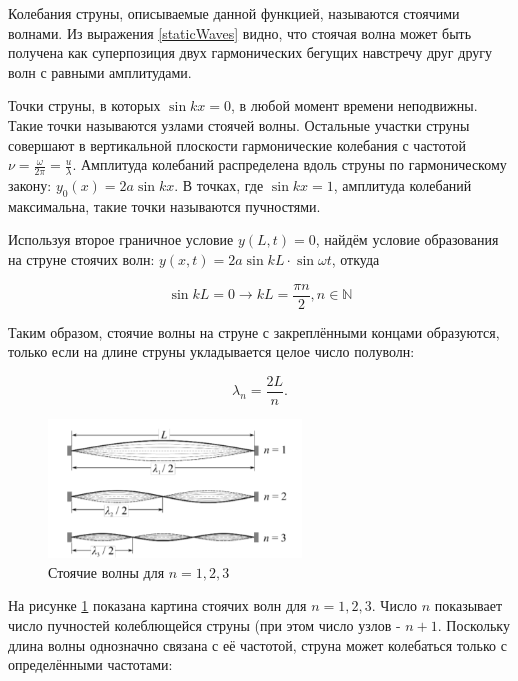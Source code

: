 \documentclass[a4paper,12pt]{article} %
\begin{document}
Колебания струны, описываемые данной функцией, называются стоячими волнами. Из выражения \eqref{staticWaves} видно, что стоячая волна может быть получена как суперпозиция двух гармонических бегущих навстречу друг другу волн с равными амплитудами. 

Точки струны, в которых $ \sin{kx} = 0 $, в любой момент времени неподвижны. Такие точки называются узлами стоячей волны. Остальные участки струны совершают в вертикальной плоскости гармонические колебания с частотой $ \nu = \frac{\omega}{2\pi} = \frac{u}{\lambda} $. Амплитуда колебаний распределена вдоль струны по гармоническому закону: $ y_0(x) = 2a\sin{kx}$. В точках,
где $ \sin{kx} = 1 $, амплитуда колебаний максимальна, такие точки называются пучностями.

Используя второе граничное условие $ y(L, t) = 0 $, найдём условие образования на струне стоячих волн: $ y(x, t) = 2a\sin{kL} \cdot \sin{\omega t}$, откуда

\begin{equation}
    \sin{kL} = 0  \longrightarrow kL = \frac{\pi n}{2}, n \in \mathbb{N}
\end{equation}

Таким образом, стоячие волны на струне с закреплёнными концами образуются, только если на длине струны укладывается целое число полуволн:

\begin{equation}
    \lambda_n = \frac{2L}{n}.
    \label{staticWaveReq}
\end{equation}

\begin{figure}
    \centering
    \includegraphics[width = 0.6\textwidth]{1.4.5 staticWaves.PNG}
    \caption{Стоячие волны для $ n = 1, 2, 3 $}
    \label{fig:staticWaves}
\end{figure}

На рисунке \ref{fig:staticWaves} показана картина стоячих волн для $ n = 1, 2, 3 $. Число $ n $ показывает число пучностей колеблющейся струны (при этом число узлов - $ n + 1 $. Поскольку длина волны однозначно связана с её частотой, струна может
колебаться только с определёнными частотами:
\end{document}
